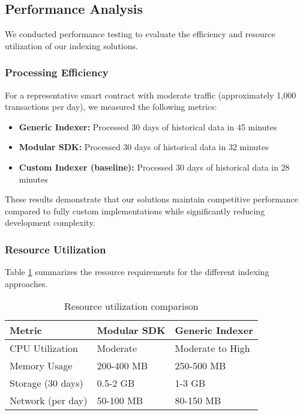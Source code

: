 \subsection{Performance Analysis}

We conducted performance testing to evaluate the efficiency and resource utilization of our indexing solutions.

\subsubsection{Processing Efficiency}

For a representative smart contract with moderate traffic (approximately 1,000 transactions per day), we measured the following metrics:

\begin{itemize}
    \item \textbf{Generic Indexer:} Processed 30 days of historical data in 45 minutes
    \item \textbf{Modular SDK:} Processed 30 days of historical data in 32 minutes
    \item \textbf{Custom Indexer (baseline):} Processed 30 days of historical data in 28 minutes
\end{itemize}

These results demonstrate that our solutions maintain competitive performance compared to fully custom implementations while significantly reducing development complexity.

\subsubsection{Resource Utilization}

Table \ref{tab:resource-utilization} summarizes the resource requirements for the different indexing approaches.

\begin{table}[h]
\centering
\begin{tabular}{p{3cm}|p{3cm}|p{3cm}}
\toprule
\textbf{Metric} & \textbf{Modular SDK} & \textbf{Generic Indexer} \\
\midrule
CPU Utilization & Moderate & Moderate to High \\
Memory Usage & 200-400 MB & 250-500 MB \\
Storage (30 days) & 0.5-2 GB & 1-3 GB \\
Network (per day) & 50-100 MB & 80-150 MB \\
\bottomrule
\end{tabular}
\caption{Resource utilization comparison}
\label{tab:resource-utilization}
\end{table}

